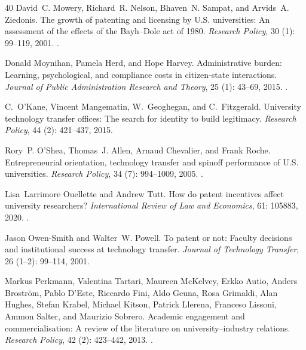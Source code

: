 \begin{thebibliography}{40}
David~C. Mowery, Richard~R. Nelson, Bhaven~N. Sampat, and Arvids~A. Ziedonis.
\newblock The growth of patenting and licensing by {U.S.} universities: An
  assessment of the effects of the {Bayh--Dole} act of 1980.
\newblock \emph{Research Policy}, 30 (1): 99--119, 2001.
\newblock {}.

Donald Moynihan, Pamela Herd, and Hope Harvey.
\newblock Administrative burden: Learning, psychological, and compliance costs
  in citizen-state interactions.
\newblock \emph{Journal of Public Administration Research and Theory},
  25 (1): 43--69, 2015.
\newblock {}.

C.~O'Kane, Vincent Mangematin, W.~Geoghegan, and C.~Fitzgerald.
\newblock University technology transfer offices: The search for identity to
  build legitimacy.
\newblock \emph{Research Policy}, 44 (2): 421--437, 2015.

Rory~P. O'Shea, Thomas~J. Allen, Arnaud Chevalier, and Frank Roche.
\newblock Entrepreneurial orientation, technology transfer and spinoff
  performance of {U.S.} universities.
\newblock \emph{Research Policy}, 34 (7): 994--1009, 2005.
\newblock {}.

Lisa~Larrimore Ouellette and Andrew Tutt.
\newblock How do patent incentives affect university researchers?
\newblock \emph{International Review of Law and Economics}, 61:
  105883, 2020.
\newblock {}.

Jason Owen-Smith and Walter~W. Powell.
\newblock To patent or not: Faculty decisions and institutional success at
  technology transfer.
\newblock \emph{Journal of Technology Transfer}, 26 (1--2):
  99--114, 2001.

Markus Perkmann, Valentina Tartari, Maureen McKelvey, Erkko Autio, Anders
  Brostr{\"o}m, Pablo D'Este, Riccardo Fini, Aldo Geuna, Rosa Grimaldi, Alan
  Hughes, Stefan Krabel, Michael Kitson, Patrick Llerena, Franceso Lissoni,
  Ammon Salter, and Maurizio Sobrero.
\newblock Academic engagement and commercialisation: A review of the literature
  on university--industry relations.
\newblock \emph{Research Policy}, 42 (2): 423--442, 2013.
\newblock {}.


\end{thebibliography}
